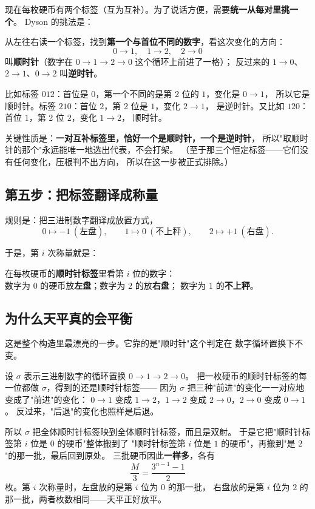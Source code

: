 \documentclass[UTF8,11pt,fontset=macnew]{ctexart}
\begin{document}
现在每枚硬币有两个标签（互为互补）。为了说话方便，需要\textbf{统一从每对里挑一个}。
Dyson 的挑法是：

\begin{keybox}
从左往右读一个标签，找到\textbf{第一个与首位不同的数字}，看这次变化的方向：
\[
0\to1,\quad 1\to2,\quad 2\to0
\]
叫\textbf{顺时针}（数字在 $0\to1\to2\to0$ 这个循环上前进了一格）；
反过来的 $1\to0$、$2\to1$、$0\to2$ 叫\textbf{逆时针}。
\end{keybox}

比如标签 $012$：首位是 $0$，第一个不同的是第 2 位的 $1$，变化是 $0\to1$，
所以它是顺时针。标签 $210$：首位 $2$，第 2 位是 $1$，变化 $2\to1$，
是逆时针。又比如 $120$：首位 $1$，第 2 位 $2$，变化 $1\to2$，
顺时针。

关键性质是：\textbf{一对互补标签里，恰好一个是顺时针，一个是逆时针}，
所以"取顺时针的那个"永远能唯一地选出代表，不会打架。
（至于那三个恒定标签——它们没有任何变化，压根判不出方向，
所以在这一步被正式排除。）

\subsection{第五步：把标签翻译成称量}

规则是：把三进制数字翻译成放置方式，
\[
0 \longmapsto -1\ (\text{左盘}), \qquad
1 \longmapsto 0\ (\text{不上秤}), \qquad
2 \longmapsto +1\ (\text{右盘}).
\]

于是，第 $i$ 次称量就是：

\begin{keybox}
在每枚硬币的\textbf{顺时针标签}里看第 $i$ 位的数字：\\
数字为 $0$ 的硬币放\textbf{左盘}；数字为 $2$ 的放\textbf{右盘}；
数字为 $1$ 的\textbf{不上秤}。
\end{keybox}

\subsection{为什么天平真的会平衡}

这是整个构造里最漂亮的一步。它靠的是"顺时针"这个判定在
数字循环置换下不变。

设 $\sigma$ 表示三进制数字的循环置换 $0\to1\to2\to0$。
把一枚硬币的顺时针标签的每一位都做 $\sigma$，得到的还是顺时针标签——
因为 $\sigma$ 把三种"前进"的变化一一对应地变成了"前进"的变化：
$0\to1$ 变成 $1\to2$，$1\to2$ 变成 $2\to0$，$2\to0$ 变成 $0\to1$。
反过来，"后退"的变化也照样是后退。

所以 $\sigma$ 把全体顺时针标签映到全体顺时针标签，而且是双射。
于是它把"顺时针标签第 $i$ 位是 $0$ 的硬币"整体搬到了
"顺时针标签第 $i$ 位是 $1$ 的硬币"，再搬到"是 $2$"的那一批，最后回到原处。
三批硬币因此\textbf{一样多}，各有
\[
\frac{M}{3}=\frac{3^{n-1}-1}{2}
\]
枚。第 $i$ 次称量时，左盘放的是第 $i$ 位为 $0$ 的那一批，
右盘放的是第 $i$ 位为 $2$ 的那一批，两者枚数相同——天平正好放平。
\end{document}
